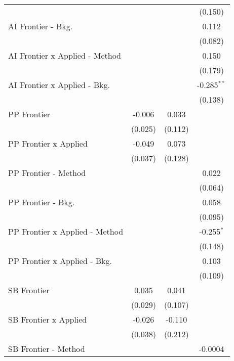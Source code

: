 \begin{tabular}{lccc}
                                  &              &         & (0.150)\\   
   AI Frontier - Bkg.             &              &         & 0.112\\   
                                  &              &         & (0.082)\\   
   AI Frontier x Applied - Method &              &         & 0.150\\   
                                  &              &         & (0.179)\\   
   AI Frontier x Applied - Bkg.   &              &         & -0.285$^{**}$\\   
                                  &              &         & (0.138)\\   
   PP Frontier                    & -0.006       & 0.033   &   \\   
                                  & (0.025)      & (0.112) &   \\   
   PP Frontier x Applied          & -0.049       & 0.073   &   \\   
                                  & (0.037)      & (0.128) &   \\   
   PP Frontier - Method           &              &         & 0.022\\   
                                  &              &         & (0.064)\\   
   PP Frontier - Bkg.             &              &         & 0.058\\   
                                  &              &         & (0.095)\\   
   PP Frontier x Applied - Method &              &         & -0.255$^{*}$\\   
                                  &              &         & (0.148)\\   
   PP Frontier x Applied - Bkg.   &              &         & 0.103\\   
                                  &              &         & (0.109)\\   
   SB Frontier                    & 0.035        & 0.041   &   \\   
                                  & (0.029)      & (0.107) &   \\   
   SB Frontier x Applied          & -0.026       & -0.110  &   \\   
                                  & (0.038)      & (0.212) &   \\   
   SB Frontier - Method           &              &         & -0.0004\\   

\end{tabular}
